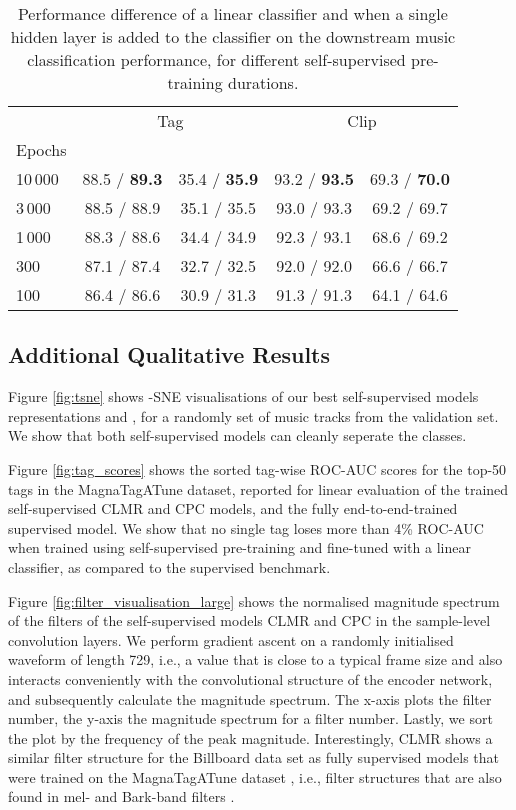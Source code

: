 \documentclass{article}
\begin{document}
\begin{table}[h]
\centering
    \footnotesize
    \begin{tabular}{lcccc}
    \toprule
    &\multicolumn{2}{c}{Tag} &\multicolumn{2}{c}{Clip}\\
    \cmidrule(lr){2-3} \cmidrule(lr){4-5}
    Epochs &  &  &  &   \\
    \midrule
    10\,000 & 88.5 / \textbf{89.3} & 35.4 / \textbf{35.9} & 93.2 / \textbf{93.5} & 69.3 / \textbf{70.0} \\
    3\,000 & 88.5 / 88.9 & 35.1 / 35.5 & 93.0 / 93.3 & 69.2 / 69.7 \\
    1\,000 & 88.3 / 88.6 & 34.4 / 34.9 & 92.3 / 93.1 & 68.6 / 69.2 \\ 
    300 & 87.1 / 87.4 & 32.7 / 32.5 & 92.0 / 92.0 & 66.6 / 66.7 \\
    100 & 86.4 / 86.6 & 30.9 / 31.3 & 91.3 / 91.3 & 64.1 / 64.6 \\ 
    \bottomrule
    \end{tabular}
    \caption{Performance difference of a linear classifier and when a single hidden layer is added to the classifier on the downstream music classification performance, for different self-supervised pre-training durations.}
    \label{tab:add_hidden_layer}
\end{table}




\subsection{Additional Qualitative Results}
Figure \ref{fig:tsne} shows -SNE visualisations \cite{maaten2008visualizing} of our best self-supervised models representations  and , for a randomly set of music tracks from the validation set. We show that both self-supervised models can cleanly seperate the classes.

Figure \ref{fig:tag_scores} shows the sorted tag-wise ROC-AUC scores for the top-50 tags in the Magna\-Tag\-A\-Tune dataset, reported for linear evaluation of the trained self-supervised CLMR and CPC models, and the fully end-to-end-trained supervised model. We show that no single tag loses more than 4\% ROC-AUC when trained using self-supervised pre-training and fine-tuned with a linear classifier, as compared to the supervised benchmark.

Figure \ref{fig:filter_visualisation_large} shows the normalised magnitude spectrum of the filters of the self-supervised models CLMR and CPC in the sample-level convolution layers. We perform gradient ascent on a randomly initialised waveform of length 729, i.e., a value that is close to a typical frame size and also interacts conveniently with the convolutional structure of the encoder network, and subsequently calculate the magnitude spectrum. The x-axis plots the filter number, the y-axis the magnitude spectrum for a filter number. Lastly, we sort the plot by the frequency of the peak magnitude. Interestingly, CLMR shows a similar filter structure for the Billboard data set as fully supervised models that were trained on the Magna\-Tag\-A\-Tune dataset \cite{dieleman2014end,lee2018samplecnn}, i.e., filter structures that are also found in mel- and Bark-band filters \cite{Stevens1937ASF, barkbank_1961}.
\end{document}
